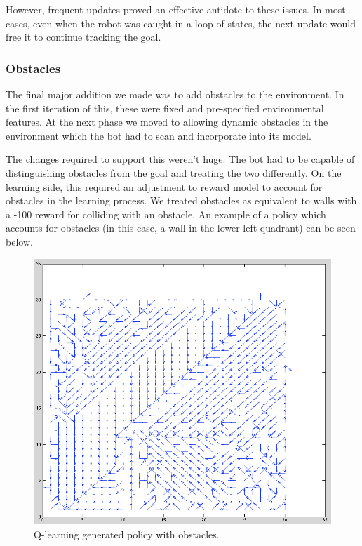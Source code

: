 \documentclass{aiaa-tc}%
\begin{document}
However, frequent updates proved an effective antidote to these
issues. In most cases, even when the robot was caught in a loop of
states, the next update would free it to continue tracking the goal.

\subsubsection{Obstacles}

The final major addition we made was to add obstacles to the
environment. In the first iteration of this, these were fixed and
pre-specified environmental features. At the next phase we moved to
allowing dynamic obstacles in the environment which the bot had to
scan and incorporate into its model.

The changes required to support this weren't huge. The bot had to be
capable of distinguishing obstacles from the goal and treating the two
differently. On the learning side, this required an adjustment to
reward model to account for obstacles in the learning
process. We treated obstacles as equivalent to walls with a -100
reward for colliding with an obstacle. An example of a policy which
accounts for obstacles (in this case, a wall in the lower left quadrant) can be
seen below.

\vspace{.3in}

\begin{figure}[htbp]
  \centering
  \includegraphics[width=\linewidth]{images/Wall2.png} 
  \caption{Q-learning generated policy with obstacles.}
  \label{fig:basicQ}
\end{figure}
\clearpage
\end{document}
